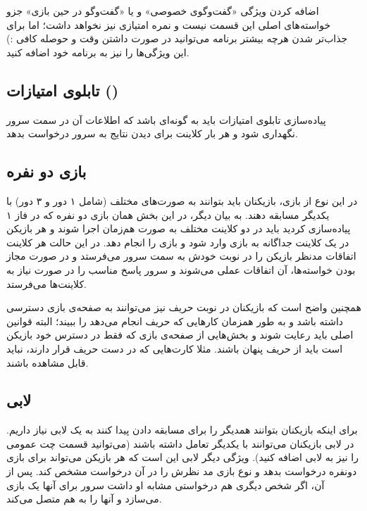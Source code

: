 \documentclass[]{article}
\begin{document}
\begin{tcolorbox}[colback=green!5!white,colframe=green!75!black,title=\textbf{نکته}]
    اضافه کردن ویژگی «گفت‌و‌گوی خصوصی» و یا «گفت‌وگو در حین بازی» جزو خواسته‌های اصلی این قسمت نیست و نمره امتیازی نیز نخواهد داشت؛ اما برای جذاب‌تر شدن هرچه بیشتر برنامه می‌توانید در صورت داشتن وقت و حوصله کافی :) این ویژگی‌ها را نیز به برنامه خود اضافه کنید.
\end{tcolorbox}


\subsection*{{\titr تابلوی امتیازات ()}}

پیاده‌سازی تابلوی امتیازات باید به گونه‌ای باشد که اطلاعات آن در سمت سرور نگهداری شود و هر بار کلاینت برای دیدن نتایج به سرور درخواست بدهد.

\subsection*{{\titr بازی دو نفره}}
در این نوع از بازی، بازیکنان باید بتوانند به صورت‌های مختلف (شامل ۱ دور و ۳ دور) با یکدیگر مسابقه دهند. به بیان دیگر، در این بخش همان بازی دو نفره که در فاز ۱ پیاده‌سازی کردید باید در دو کلاینت مختلف به صورت هم‌زمان اجرا شوند و هر بازیکن در یک کلاینت جداگانه به بازی وارد شود و بازی را انجام دهد. در این حالت هر کلاینت اتفاقات مدنظر بازیکن را در نوبت خودش به سمت سرور می‌فرستد و در صورت مجاز بودن خواسته‌ها، آن اتفاقات عملی می‌شوند و سرور پاسخ مناسب را در صورت نیاز به کلاینت‌ها می‌فرستد.

همچنین واضح است که بازیکنان در نوبت حریف نیز می‌توانند به صفحه‌ی بازی دسترسی داشته باشد و به طور همزمان کارهایی که حریف انجام می‌دهد را ببیند؛ البته قوانین اصلی باید رعایت شوند و بخش‌هایی از صفحه‌ی بازی که فقط در دسترس خود بازیکن است باید از حریف پنهان باشند. مثلا کارت‌هایی که در دست حریف قرار دارند، نباید قابل مشاهده باشند.

\subsection*{{\titr لابی}}
برای اینکه بازیکنان بتوانند همدیگر را برای مسابقه دادن پیدا کنند به یک لابی نیاز داریم. در لابی بازیکنان می‌توانند با یکدیگر تعامل داشته باشند (می‌توانید قسمت چت عمومی را نیز به لابی اضافه کنید). ویژگی دیگر لابی این است که هر بازیکن می‌تواند برای بازی دونفره درخواست بدهد و نوع بازی مد نظرش را در آن درخواست مشخص کند. پس از آن، اگر شخص دیگری هم درخواستی مشابه او داشت سرور برای آنها یک بازی می‌سازد و آنها را به هم متصل می‌کند. 
\end{document}
